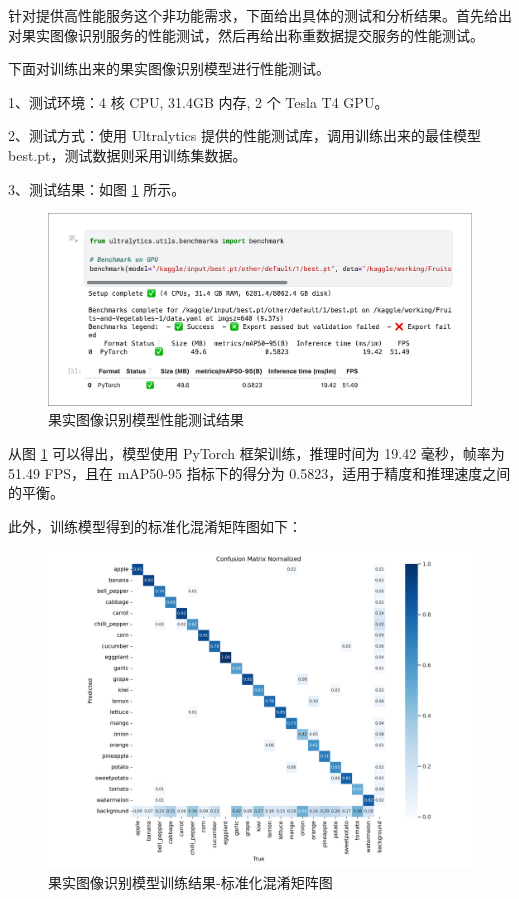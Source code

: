 针对提供高性能服务这个非功能需求，下面给出具体的测试和分析结果。首先给出对果实图像识别服务的性能测试，然后再给出称重数据提交服务的性能测试。

下面对训练出来的果实图像识别模型进行性能测试。

1、测试环境：4 核 CPU, 31.4GB 内存, 2 个 Tesla T4 GPU。

2、测试方式：使用 Ultralytics 提供的性能测试库，调用训练出来的最佳模型 best.pt，测试数据则采用训练集数据。

3、测试结果：如图 \ref{fig:model-benchmark} 所示。

\begin{figure}[H]
    \centering
    \includegraphics[width=0.8\linewidth]{../source/aws-img/yolov8/benchmark.png}
    \caption{果实图像识别模型性能测试结果}
    \label{fig:model-benchmark}
\end{figure}

从图 \ref{fig:model-benchmark} 可以得出，模型使用 PyTorch 框架训练，推理时间为 19.42 毫秒，帧率为 51.49 FPS，且在 mAP50-95 指标下的得分为 0.5823，适用于精度和推理速度之间的平衡。

此外，训练模型得到的标准化混淆矩阵图如下：

\begin{figure}[H]
    \centering
    \includegraphics[width=0.8\linewidth]{../source/aws-img/yolov8/out/image/confusion_matrix_normalized.png}
    \caption{果实图像识别模型训练结果-标准化混淆矩阵图}
    \label{fig:confusion_matrix_normalized}
\end{figure}

